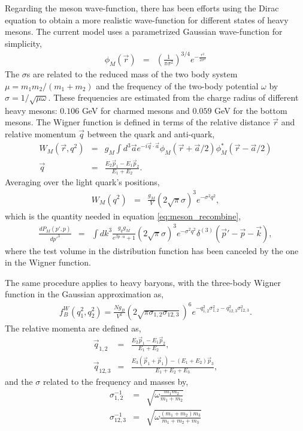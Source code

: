 Regarding the meson wave-function, there has been efforts using the Dirac equation to obtain a more realistic wave-function for different states of heavy mesons.
The current model uses a parametrized Gaussian wave-function for simplicity,
\begin{eqnarray}
\phi_M(\vec{r}) &=& \left(\frac{1}{\pi \sigma^2}\right)^{3/4} e^{-\frac{r^2}{2\sigma^2}}
\end{eqnarray}
The $\sigma$s are related to the reduced mass of the two body system $\mu = m_1 m_2/(m_1+m_2)$ and the frequency of the  two-body potential $\omega$ by $\sigma = 1/\sqrt{\mu \omega}$.
These frequencies are estimated from the charge radius of different heavy mesons: $0.106$ GeV for charmed mesons and $0.059$ GeV for the bottom mesons.
The Wigner function is defined in terms of the relative distance $\vec{r}$ and relative momentum $\vec{q}$ between the quark and anti-quark,
\begin{eqnarray}
W_M(\vec{r}, q^2) &=& g_M \int d^3 \vec{a} e^{-i\vec{q}\cdot \vec{a}} \phi_M(\vec{r}+\vec{a}/2) \phi_M^*(\vec{r}-\vec{a}/2) \\
\vec{q} &=& \frac{E_2\vec{p}_1 - E_1\vec{p}_2}{E_1+E_2}.
\end{eqnarray} 
Averaging over the light quark's positions,
\begin{eqnarray}
W_M(q^2) &=& \frac{g_M}{V} (2\sqrt{\pi}\sigma)^3 e^{-\sigma^2 q^2},
\end{eqnarray}
which is the quantity needed in equation \ref{eq:meson_recombine},
\begin{eqnarray}
\frac{dP_M(p',p)}{dp'^3} &=& \int dk^3 \frac{g_q g_M}{e^{\beta p\cdot u} + 1} (2\sqrt{\pi}\sigma)^3 e^{-\sigma^2 q^2} \delta^{(3)}(\vec{p}'-\vec{p}-\vec{k}),
\end{eqnarray}
where the test volume in the distribution function has been canceled by the one in the Wigner function.

The same procedure applies to heavy baryons, with the three-body Wigner function in the Gaussian approximation as,
\begin{eqnarray}
f_B^W(q_1^2, q_2^2) = \frac{N g_B}{V^2} (2\sqrt{\pi\sigma_{1,2}\sigma_{12,3}})^6 e^{-q_{1,2}^2 \sigma_{1,2}^2 - q_{12,3}^2 \sigma_{12,3}^2}.
\end{eqnarray}
The relative momenta are defined as,
\begin{eqnarray}
\vec{q}_{1,2} &=& \frac{E_2 \vec{p}_1 -E_1\vec{p}_2}{E_1+E_2},\\
\vec{q}_{12,3} &=& \frac{E_3 (\vec{p}_1+\vec{p}_1) - (E_1+E_2)\vec{p}_3}{E_1+E_2 + E_3},
\end{eqnarray}
and the $\sigma$ related to the frequency and masses by,
\begin{eqnarray}
\sigma_{1,2}^{-1} &=& \sqrt{\omega \frac{m_1m_2}{m_1+m_2}}\\
\sigma_{12,3}^{-1} &=& \sqrt{\omega \frac{(m_1+m_2)m_3}{m_1+m_2+m_3}}
\end{eqnarray}

